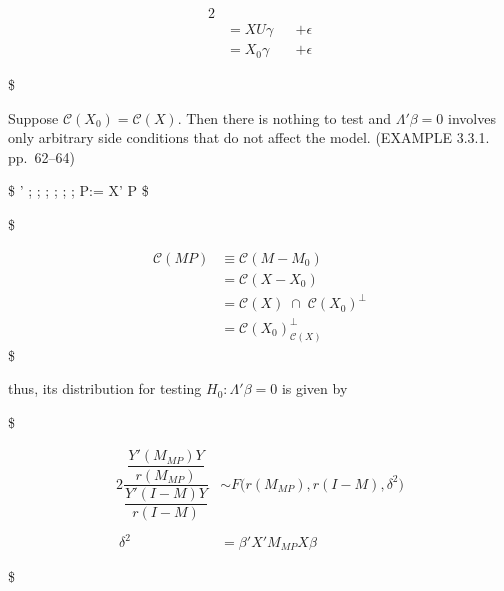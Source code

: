 \documentclass[
]{book}
\begin{document}
{{{\begin{alignat}{2}
\\

&= X U \gamma &&+ \epsilon

\\

&= X_0 \gamma &&+ \epsilon \tag{3}

\end{alignat}

\$

Suppose \(\mathcal{C}(X_0) = \mathcal{C}(X)\). Then there is nothing to test and \(\Lambda' \beta = 0\) involves only arbitrary side conditions that do not affect the model. (EXAMPLE 3.3.1. pp.~62--64)

\$
\Lambda ' \beta ; ;  ; ; \iff ; ; \exists P:\Lambda = X' P
\$

\$

\begin{align}

\mathcal{C}(MP) &\equiv \mathcal{C}(M-M_0) \\




&= \mathcal{C}(X-X_0) \\



&= \mathcal{C}(X) \; \cap \; \mathcal{C}(X_0)^\perp\\


&= \mathcal{C}(X_0)_{\mathcal{C}(X)}^\perp


\end{align}
\$

thus, its distribution for testing \(H_0: \Lambda ' \beta = 0\) is given by

\$

\begin{alignat}{2}

\dfrac
{\dfrac{Y'(M_{MP})Y}{r(M_{MP})}}
{\dfrac{Y'(I-M)Y}{r(I-M)}}

&\sim F \Big( r(M_{MP}), r(I-M), \delta^2 \Big)

 \tag{5}

\\
\\\

\delta^2 &= \beta ' X' M_{MP}X \beta

 \tag{non-centrality parameter}





\end{alignat}

\$

}}}
\end{document}
